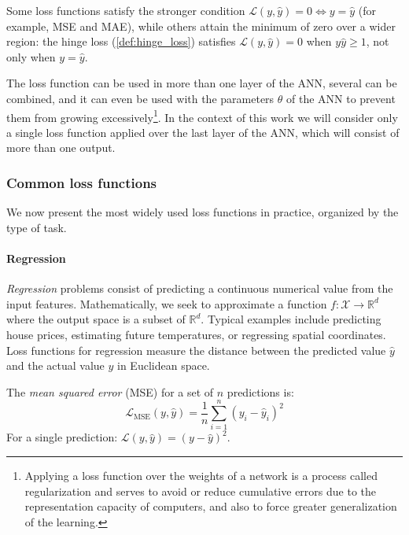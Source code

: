 \begin{remark}
Some loss functions satisfy the stronger condition \(\mathcal{L}(y, \hat{y}) = 0 \iff y = \hat{y}\) (for example, MSE and MAE), while others attain the minimum of zero over a wider region: the hinge loss (\autoref{def:hinge_loss}) satisfies \(\mathcal{L}(y, \hat{y}) = 0\) when \(y \hat{y} \geq 1\), not only when \(y = \hat{y}\).
\end{remark}

The loss function can be used in more than one layer of the \gls{ANN}, several can be combined, and it can even be used with the parameters \(\theta\) of the \gls{ANN} to prevent them from growing excessively\footnote{Applying a loss function over the weights of a network is a process called regularization and serves to avoid or reduce cumulative errors due to the representation capacity of computers, and also to force greater generalization of the learning.}. In the context of this work we will consider only a single loss function applied over the last layer of the \gls{ANN}, which will consist of more than one output.


\subsubsection{Common loss functions}

We now present the most widely used loss functions in practice, organized by the type of task.

\paragraph{Regression}

\textit{Regression} problems consist of predicting a continuous numerical value from the input features. Mathematically, we seek to approximate a function \(f: \mathcal{X} \to \mathbb{R}^d\) where the output space is a subset of \(\mathbb{R}^d\). Typical examples include predicting house prices, estimating future temperatures, or regressing spatial coordinates. Loss functions for regression measure the distance between the predicted value \(\hat{y}\) and the actual value \(y\) in Euclidean space.

\begin{definition}\label{def:mse}
	The \textit{mean squared error} (\gls{MSE}) for a set of \(n\) predictions is:
	\[
		\mathcal{L}_{\text{MSE}}(y, \hat{y}) = \frac{1}{n} \sum_{i=1}^{n} (y_i - \hat{y}_i)^2
	\]
	For a single prediction: \(\mathcal{L}(y, \hat{y}) = (y - \hat{y})^2\).
\end{definition}

